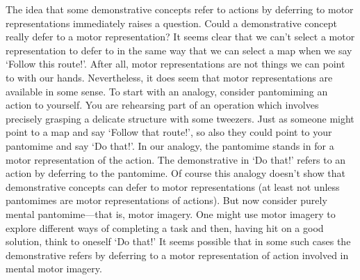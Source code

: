 \documentclass[12pt,\papersize]{extarticle}
\begin{document}
The idea that some demonstrative concepts refer to actions by deferring to motor representations immediately raises a question. Could a demonstrative concept really defer to a motor representation? It seems clear that we can't select a motor representation to defer to in the same way that we can select a map when we say `Follow this route!'. After all, motor representations are not things we can point to with our hands. Nevertheless, it does seem that motor representations are available in some sense. To start with an analogy, consider pantomiming an action to yourself. You are rehearsing part of an operation which involves precisely grasping a delicate structure with some tweezers. Just as someone might point to a map and say `Follow that route!', so also they could point to your pantomime and say `Do that!'. In our analogy, the pantomime stands in for a motor representation of the action.  The demonstrative in `Do that!' refers to an action by deferring to the pantomime. Of course this analogy doesn't show that demonstrative concepts can defer to motor representations (at least not unless pantomimes are motor representations of actions). But now consider purely mental pantomime---that is, motor imagery. One might use motor imagery to explore different ways of completing a task and then, having hit on a good solution, think to oneself `Do that!' It seems possible that in some such cases the demonstrative refers by deferring to a motor representation of action involved in mental motor imagery.
\end{document}
